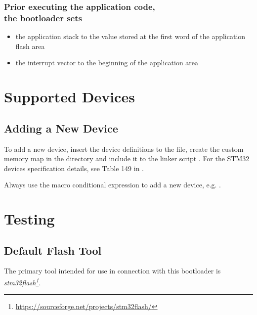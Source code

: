 \subsubsection*{Prior executing the application code,\\the bootloader sets}
\begin{itemize}
  \item the application stack to the value stored at the first word of the application flash area
  \item the interrupt vector to the beginning of the application area
\end{itemize}

\clearpage
\section{Supported Devices}\label{sec:supportedDevices}


\subsection{Adding a New Device}

To add a new device, insert the device definitions to the  file, create the custom memory map in the  directory and include it to the linker script  . For the STM32 devices specification details, see Table 149 in \cite{STM32:AN2606}.

Always use the macro conditional expression to add a new device, e.g. .



\clearpage
\section{Testing}

\subsection{Default Flash Tool}

The primary tool intended for use in connection with this bootloader is {\it stm32flash\footnote{\url{https://sourceforge.net/projects/stm32flash/}}}.

